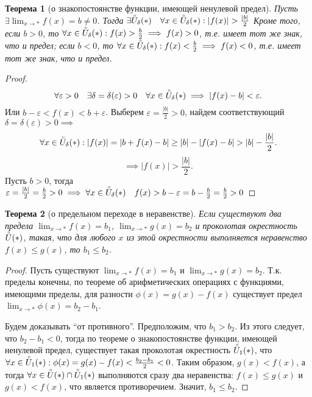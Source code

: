 \documentclass[a4paper,12pt]{article} %
\newtheorem{theorem}{Теорема}[section]
\theoremstyle{remark}
\theoremstyle{definition}
\begin{document}
\begin{theorem}[о знакопостоянстве функции, имеющей ненулевой предел]
	Пусть $\exists  \lim_{x \to *} f(x) = b \neq 0$. Тогда $\exists \accentset{\circ}{U}_\delta(*) \quad \forall x \in \accentset{\circ}{U}_\delta(*) : |f(x)| > \frac{|b|}{2}$ 
	Кроме того, если $b>0$, то  $\forall x \in \accentset{\circ}{U}_\delta(*) : f(x) > \frac{b}{2} \implies f(x) > 0$, т.е. имеет тот же знак, что и предел;
	если $b<0$, то $\forall x \in  \accentset{\circ}{U}_\delta(*) : f(x) < \frac{b}{2} \implies f(x) <0$, т.е. имеет тот же знак, что и предел.
\end{theorem}

\begin{proof}
	\[
	\forall \varepsilon> 0 \quad \exists \delta=\delta(\varepsilon)>0 \quad \forall x\in \accentset    {\circ}{U}_\delta(*) \implies |f(x) - b| < \varepsilon
	.\] 
	Или $b - \varepsilon < f(x) < b + \varepsilon$.
	Выберем $\varepsilon = \frac{|b|}{2} > 0$, найдем соответствующий $\delta = \delta(\varepsilon) > 0 \implies$
	\[
	\forall x \in  \accentset{\circ}{U}_\delta(*) : |f(x)| = |b + f(x) - b| \ge  |b| - |f(x) - b| > |b| - \frac{|b|}{2}
	.\] 
	\[
	\implies |f(x)| > \frac{|b|}{2}
	.\] 
Пусть $b > 0$, тогда $\varepsilon = \frac{|b|}{2} = \frac{b}{2} > 0 \implies \forall x \in  \accentset{\circ}{U}_\delta(*) \quad f(x) > b - \varepsilon = b - \frac{b}{2} = \frac{b}{2} > 0$
\end{proof}

\begin{theorem}[о предельном переходе в неравенстве]
	Если существуют два предела $\lim_{x \to *} f(x) = b_1$, $\lim_{x \to *} g(x) = b_2$ и проколотая окрестность $\accentset{\circ}{U}(*)$, такая, что для любого $x$ из этой окрестности выполняется неравенство $f(x) \le g(x)$, то $b_1\le b_2$.
\end{theorem}
\begin{proof}
	Пусть существуют $\lim_{x \to *} f(x) = b_1$ и $\lim_{x \to *} g(x) = b_2$. Т.к. пределы конечны, по теореме об арифметических операциях с функциями, имеющими пределы, для разности $\phi(x) = g(x) - f(x)$ существует предел $\lim_{x \to *} \phi(x) = b_2-b_1$.

	Будем доказывать ``от противного''. Предположим, что $b_1>b_2$. Из этого следует, что $b_2-b_1<0$, тогда по теореме о знакопостоянстве функции, имеющей ненулевой предел, существует такая проколотая окрестность $\accentset{\circ}{U}_1(*)$, что $\forall x \in  \accentset{\circ}{U}_1(*) : \phi(x) = g(x) - f(x) < \frac{b_2-b_1}{2} < 0$. Таким образом, $g(x) < f(x)$, а тогда $\forall x \in  \accentset{\circ}{U}(*) \cap \accentset{\circ}{U}_1(*)$ выполняются сразу два неравенства: $f(x) \le  g(x)$ и $g(x) < f(x)$, что является противоречием. Значит, $b_1\le b_2$.
\end{proof}
\end{document}
